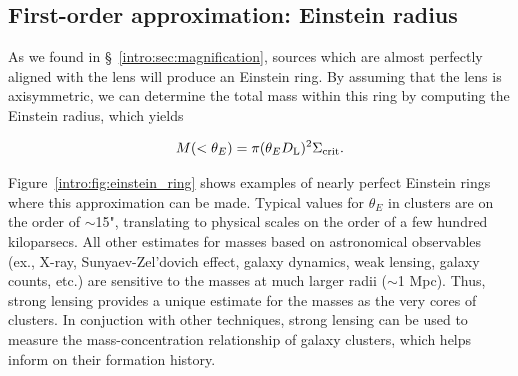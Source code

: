 \subsection{First-order approximation: Einstein radius}

As we found in \S~\ref{intro:sec:magnification}, sources which are almost perfectly aligned with the lens will produce an Einstein ring. By assuming that the lens is axisymmetric, we can determine the total mass within this ring by computing the Einstein radius, which yields

\begin{equation}
M(<\theta_E) = \pi (\theta_E D_\mathrm{L})^2 \Sigma_\mathrm{crit}.
\label{intro:eqn:einstein_mass}
\end{equation}

Figure~\ref{intro:fig:einstein_ring} shows examples of nearly perfect Einstein rings where this approximation can be made. Typical values for $\theta_E$ in clusters are on the order of $\sim$15", translating to physical scales on the order of a few hundred kiloparsecs. All other estimates for masses based on astronomical observables (ex., X-ray, Sunyaev-Zel'dovich effect, galaxy dynamics, weak lensing, galaxy counts, etc.) are sensitive to the masses at much larger radii ($\sim$1 Mpc). Thus, strong lensing provides a unique estimate for the masses as the very cores of clusters. In conjuction with other techniques, strong lensing can be used to measure the mass-concentration relationship of galaxy clusters, which helps inform on their formation history.

